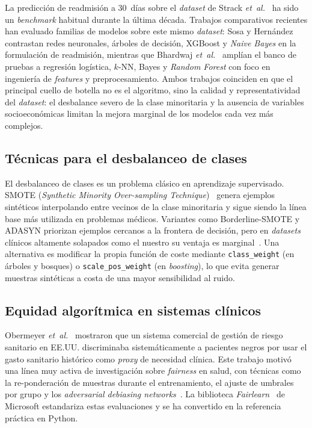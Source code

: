 \documentclass[11pt,a4paper]{article}
\begin{document}
La predicción de readmisión a 30~días sobre el \textit{dataset} de Strack \emph{et~al.}~\cite{ref_strack} ha sido un \textit{benchmark} habitual durante la última década. Trabajos comparativos recientes han evaluado familias de modelos sobre este mismo \textit{dataset}: Sosa y Hernández~\cite{ref_sosa} contrastan redes neuronales, árboles de decisión, XGBoost y \textit{Naive Bayes} en la formulación de readmisión, mientras que Bhardwaj \emph{et~al.}~\cite{ref_bhardwaj} amplían el banco de pruebas a regresión logística, $k$-NN, Bayes y \textit{Random Forest} con foco en ingeniería de \textit{features} y preprocesamiento. Ambos trabajos coinciden en que el principal cuello de botella no es el algoritmo, sino la calidad y representatividad del \textit{dataset}: el desbalance severo de la clase minoritaria y la ausencia de variables socioeconómicas limitan la mejora marginal de los modelos cada vez más complejos.

\subsection{Técnicas para el desbalanceo de clases}

El desbalanceo de clases es un problema clásico en aprendizaje supervisado. SMOTE (\textit{Synthetic Minority Over-sampling Technique})~\cite{ref_smote} genera ejemplos sintéticos interpolando entre vecinos de la clase minoritaria y sigue siendo la línea base más utilizada en problemas médicos. Variantes como Borderline-SMOTE y ADASYN priorizan ejemplos cercanos a la frontera de decisión, pero en \textit{datasets} clínicos altamente solapados como el nuestro su ventaja es marginal~\cite{ref_smote}. Una alternativa es modificar la propia función de coste mediante \texttt{class\_weight} (en árboles y bosques) o \texttt{scale\_pos\_weight} (en \textit{boosting}), lo que evita generar muestras sintéticas a costa de una mayor sensibilidad al ruido.

\subsection{Equidad algorítmica en sistemas clínicos}

Obermeyer \emph{et~al.}~\cite{ref_obermeyer} mostraron que un sistema comercial de gestión de riesgo sanitario en EE.UU. discriminaba sistemáticamente a pacientes negros por usar el gasto sanitario histórico como \textit{proxy} de necesidad clínica. Este trabajo motivó una línea muy activa de investigación sobre \textit{fairness} en salud, con técnicas como la re-ponderación de muestras durante el entrenamiento, el ajuste de umbrales por grupo y los \textit{adversarial debiasing networks}~\cite{ref_mehrabi}. La biblioteca \textit{Fairlearn}~\cite{ref_fairlearn} de Microsoft estandariza estas evaluaciones y se ha convertido en la referencia práctica en Python.
\end{document}
